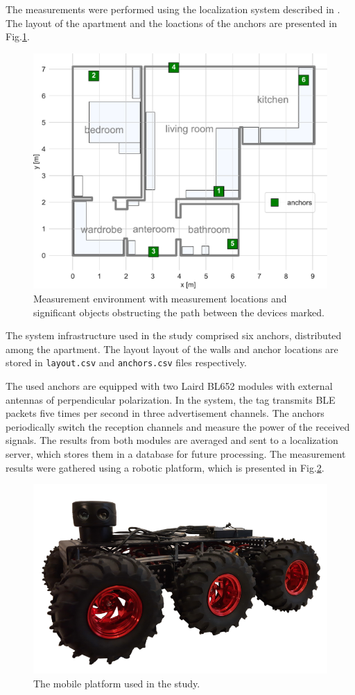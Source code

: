 \documentclass[conference, 11pt, onecolumn]{IEEEtran}
\begin{document}
The measurements were performed using the localization system described in \cite{b1}. The layout of the apartment and the loactions of the anchors are presented in Fig.\ref{plan}.

\begin{figure}[h]
\centerline{\includegraphics[width=.7\columnwidth]{figs/layout}}
\caption{Measurement environment with measurement locations and significant objects obstructing the path between the devices marked.}
\label{plan}
\end{figure}

The system infrastructure used in the study comprised six anchors, distributed among the apartment. The layout layout of the walls and anchor locations are stored in \texttt{layout.csv} and \texttt{anchors.csv} files respectively.

The used anchors are equipped with two Laird BL652 modules with external antennas of perpendicular polarization. In the system, the tag transmits BLE packets five times per second in three advertisement channels. The anchors periodically switch the reception channels and measure the power of the received signals. The results from both modules are averaged and sent to a localization server, which stores them in a database for future processing. The measurement results were gathered using a robotic platform, which is presented in Fig.\ref{fig:robot}.

\begin{figure}[h]
\centering
\includegraphics[width=0.5\columnwidth]{figs/robot}
\caption{\label{fig:robot}The mobile platform used in the study.}
\end{figure}
\end{document}
